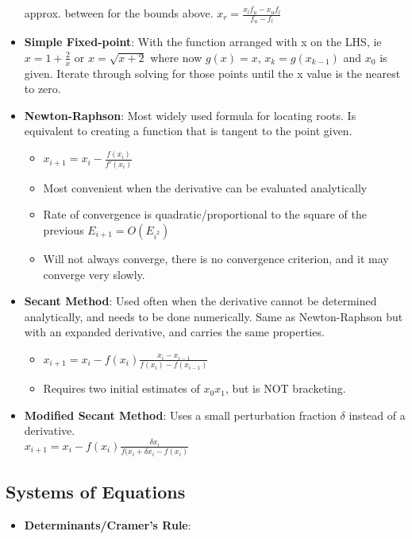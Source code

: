 \documentclass[fontsize=4pt]{scrartcl}
\begin{document}
\begin{multicols}{4}
\begin{itemize}
          approx. between for the bounds above.
          $x_r = \frac{x_lf_u-x_uf_l}{f_u-f_l}$
        \item \textbf{Simple Fixed-point}: With the function arranged with x on the LHS, ie $x = 1+\frac{2}{x}$ or
          $x = \sqrt{x+2}$ where now $g(x) = x$, $x_k = g(x_{k-1})$ and $x_0$ is given. Iterate through solving
          for those points until the x value is the nearest to zero.
        \item \textbf{Newton-Raphson}: Most widely used formula for locating roots. Is equivalent to creating a 
        function that is tangent to the point given.
          \begin{itemize}
            \item $x_{i+1} = x_i - \frac{f(x_i)}{f'(x_i)}$
            \item Most convenient when the derivative can be evaluated analytically
            \item Rate of convergence is quadratic/proportional to the square of the previous $E_{i+1} = O(E_{i^2})$
            \item Will not always converge, there is no convergence criterion, and it may converge very slowly.
          \end{itemize}
        \item \textbf{Secant Method}: Used often when the derivative cannot be determined analytically, and needs
          to be done numerically. Same as Newton-Raphson but with an expanded derivative, and carries the same
          properties.
          \begin{itemize}
            \item $x_{i+1} = x_i - f(x_i)\frac{x_i-x_{i-1}}{f(x_i)-f(x_{i-1})}$
            \item Requires two initial estimates of $x_0 x_1$, but is NOT bracketing.
          \end{itemize}
        \item \textbf{Modified Secant Method}: Uses a small perturbation fraction $\delta$ instead of a derivative. \\
          $x_{i+1} = x_i - f(x_i)\frac{\delta x_i}{f(x_i+\delta x_i-f(x_i)}$
      \end{itemize}
    \subsection{Systems of Equations}
      \begin{itemize}
       \item \textbf{Determinants/Cramer's Rule}: 
      \end{itemize}



\end{multicols}
\end{document}
